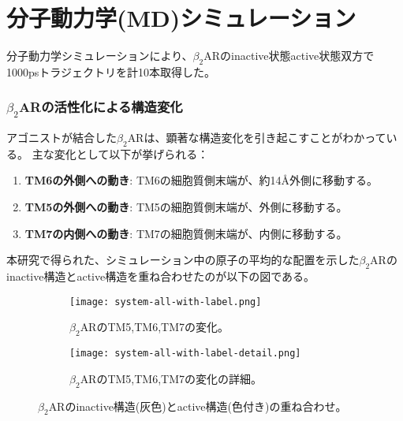 \section{分子動力学(MD)シミュレーション}

分子動力学シミュレーションにより、$\beta_2$ARのinactive状態active状態双方で1000psトラジェクトリを計10本取得した。

\subsubsection{$\beta_2$ARの活性化による構造変化}
アゴニストが結合した$\beta_2$ARは、顕著な構造変化を引き起こす\cite{rasmussen2011crystal}\cite{poudel2021activation}ことがわかっている。
主な変化として以下が挙げられる：
\begin{enumerate}
    \item \textbf{TM6の外側への動き}: TM6の細胞質側末端が、約14Å外側に移動する。
    \item \textbf{TM5の外側への動き}: TM5の細胞質側末端が、外側に移動する。
    \item \textbf{TM7の内側への動き}: TM7の細胞質側末端が、内側に移動する。
\end{enumerate}

本研究で得られた、シミュレーション中の原子の平均的な配置を示した$\beta_2$ARのinactive構造とactive構造を重ね合わせたのが以下の図である。
\begin{figure}[htbp]
  \centering
  \begin{subfigure}{0.88\textwidth} %
    \centering
    \texttt{[image: system-all-with-label.png]}
    \caption{$\beta_2$ARのTM5,TM6,TM7の変化。}
    \label{fig:fitting_TM}
  \end{subfigure}
  \hspace{0.02\textwidth} %
  \begin{subfigure}{0.88\textwidth}
    \centering
    \texttt{[image: system-all-with-label-detail.png]}
    \caption{$\beta_2$ARのTM5,TM6,TM7の変化の詳細。}
    \label{fig:fitting_TM_detail}
  \end{subfigure}
  \caption{$\beta_2$ARのinactive構造(灰色)とactive構造(色付き)の重ね合わせ。}
  \label{fig:fitting-all}
\end{figure}


